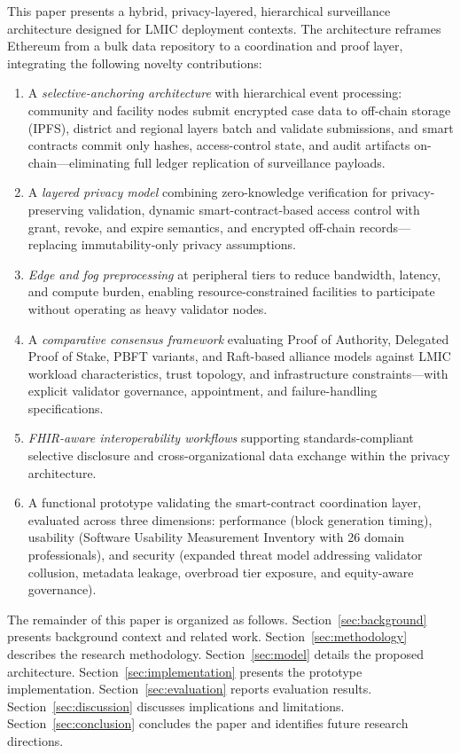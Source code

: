This paper presents a hybrid, privacy-layered, hierarchical surveillance architecture designed for LMIC deployment contexts. The architecture reframes Ethereum from a bulk data repository to a coordination and proof layer, integrating the following novelty contributions:

\begin{enumerate}
\item A \emph{selective-anchoring architecture} with hierarchical event processing: community and facility nodes submit encrypted case data to off-chain storage (IPFS), district and regional layers batch and validate submissions, and smart contracts commit only hashes, access-control state, and audit artifacts on-chain---eliminating full ledger replication of surveillance payloads.
\item A \emph{layered privacy model} combining zero-knowledge verification for privacy-preserving validation, dynamic smart-contract-based access control with grant, revoke, and expire semantics, and encrypted off-chain records---replacing immutability-only privacy assumptions.
\item \emph{Edge and fog preprocessing} at peripheral tiers to reduce bandwidth, latency, and compute burden, enabling resource-constrained facilities to participate without operating as heavy validator nodes.
\item A \emph{comparative consensus framework} evaluating Proof of Authority, Delegated Proof of Stake, PBFT variants, and Raft-based alliance models against LMIC workload characteristics, trust topology, and infrastructure constraints---with explicit validator governance, appointment, and failure-handling specifications.
\item \emph{FHIR-aware interoperability workflows} supporting standards-compliant selective disclosure and cross-organizational data exchange within the privacy architecture.
\item A functional prototype validating the smart-contract coordination layer, evaluated across three dimensions: performance (block generation timing), usability (Software Usability Measurement Inventory with 26 domain professionals), and security (expanded threat model addressing validator collusion, metadata leakage, overbroad tier exposure, and equity-aware governance).
\end{enumerate}

The remainder of this paper is organized as follows. Section~\ref{sec:background} presents background context and related work. Section~\ref{sec:methodology} describes the research methodology. Section~\ref{sec:model} details the proposed architecture. Section~\ref{sec:implementation} presents the prototype implementation. Section~\ref{sec:evaluation} reports evaluation results. Section~\ref{sec:discussion} discusses implications and limitations. Section~\ref{sec:conclusion} concludes the paper and identifies future research directions.

